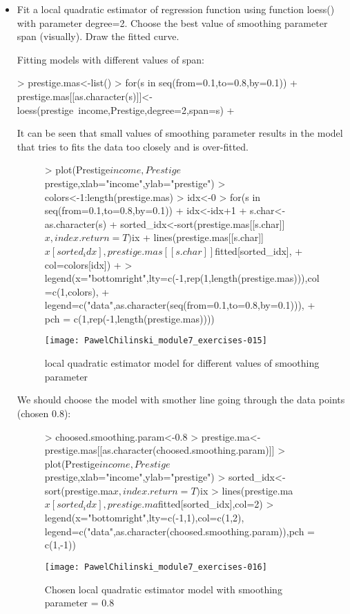 \documentclass[a4paper]{article}
\begin{document}
\begin{itemize}
\item Fit a local quadratic estimator of regression function using function
loess() with parameter degree=2. Choose the best value of smoothing parameter span (visually). Draw the fitted curve.

Fitting models with different values of span:
\begin{Schunk}
\begin{Sinput}
> prestige.mas<-list()
> for(s in seq(from=0.1,to=0.8,by=0.1)){
+ 	prestige.mas[[as.character(s)]]<-loess(prestige~income,Prestige,degree=2,span=s)	
+ }
\end{Sinput}
\end{Schunk}
It can be seen that small values of smoothing parameter results in the model
that tries to fits the data too closely and is over-fitted. 
\begin{figure}[H]
\begin{center}
\begin{Schunk}
\begin{Sinput}
> plot(Prestige$income,Prestige$prestige,xlab="income",ylab="prestige")
> colors<-1:length(prestige.mas)
> idx<-0
> for(s in seq(from=0.1,to=0.8,by=0.1)){
+ 	idx<-idx+1
+ 	s.char<-as.character(s)
+ 	sorted_idx<-sort(prestige.mas[[s.char]]$x,index.return=T)$ix
+ 	lines(prestige.mas[[s.char]]$x[sorted_idx],prestige.mas[[s.char]]$fitted[sorted_idx],
+ 			col=colors[idx])	
+ }
> legend(x="bottomright",lty=c(-1,rep(1,length(prestige.mas))),col=c(1,colors), 
+ 		legend=c("data",as.character(seq(from=0.1,to=0.8,by=0.1))),
+ 		pch = c(1,rep(-1,length(prestige.mas))))
\end{Sinput}
\end{Schunk}
\texttt{[image: PawelChilinski\_module7\_exercises-015]}
\caption{local quadratic estimator model for different values of smoothing parameter}
\end{center}
\end{figure}

We should choose the model with smother line going through the data points
(chosen 0.8):
\begin{figure}[H]
\begin{center}
\begin{Schunk}
\begin{Sinput}
> choosed.smoothing.param<-0.8
> prestige.ma<-prestige.mas[[as.character(choosed.smoothing.param)]]
> plot(Prestige$income,Prestige$prestige,xlab="income",ylab="prestige")
> sorted_idx<-sort(prestige.ma$x,index.return=T)$ix
> lines(prestige.ma$x[sorted_idx],prestige.ma$fitted[sorted_idx],col=2)	
> legend(x="bottomright",lty=c(-1,1),col=c(1,2), legend=c("data",as.character(choosed.smoothing.param)),pch = c(1,-1))
\end{Sinput}
\end{Schunk}
\texttt{[image: PawelChilinski\_module7\_exercises-016]}
\caption{Chosen local quadratic estimator model with smoothing parameter =
0.8}
\end{center}
\end{figure}


\end{itemize}
\end{document}
